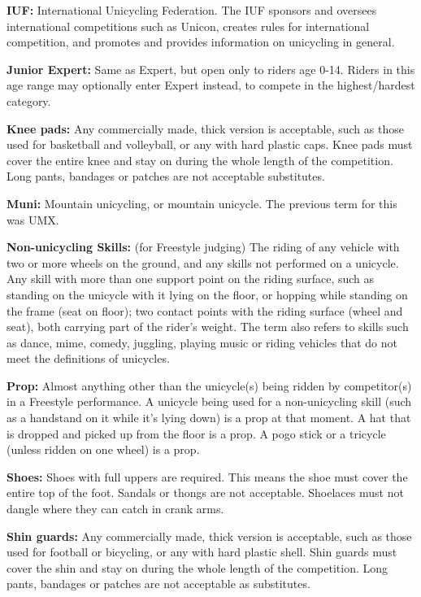 \textbf{IUF:} International Unicycling Federation.
The IUF sponsors and oversees international competitions such as Unicon, creates rules for international competition, and promotes and provides information on unicycling in general.

\textbf{Junior Expert:} Same as Expert, but open only to riders age 0-14.
Riders in this age range may optionally enter Expert instead, to compete in the highest/hardest category.

\textbf{Knee pads:} Any commercially made, thick version is acceptable, such as those used for basketball and volleyball, or any with hard plastic caps.
Knee pads must cover the entire knee and stay on during the whole length of the competition.
Long pants, bandages or patches are not acceptable substitutes.

\textbf{Muni:} Mountain unicycling, or mountain unicycle.
The previous term for this was UMX.

\textbf{Non-unicycling Skills:} (for Freestyle judging) The riding of any vehicle with two or more wheels on the ground, and any skills not performed on a unicycle.
Any skill with more than one support point on the riding surface, such as standing on the unicycle with it lying on the floor, or hopping while standing on the frame (seat on floor); two contact points with the riding surface (wheel and seat), both carrying part of the rider's weight.
The term also refers to skills such as dance, mime, comedy, juggling, playing music or riding vehicles that do not meet the definitions of unicycles.

\textbf{Prop:} Almost anything other than the unicycle(s) being ridden by competitor(s) in a Freestyle performance.
A unicycle being used for a non-unicycling skill (such as a handstand on it while it's lying down) is a prop at that moment.
A hat that is dropped and picked up from the floor is a prop.
A pogo stick or a tricycle (unless ridden on one wheel) is a prop.

\textbf{Shoes:} Shoes with full uppers are required.
This means the shoe must cover the entire top of the foot.
Sandals or thongs are not acceptable.
Shoelaces must not dangle where they can catch in crank arms.

\textbf{Shin guards:} Any commercially made, thick version is acceptable, such as those used for football or bicycling, or any with hard plastic shell.
Shin guards must cover the shin and stay on during the whole length of the competition.
Long pants, bandages or patches are not acceptable as substitutes.


